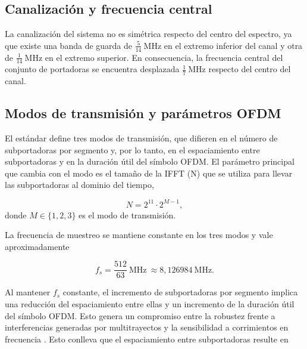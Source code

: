 
\subsection{Canalización y frecuencia central}

La canalización del sistema no es simétrica respecto del centro del espectro, ya que existe una banda de guarda de $\frac{5}{14}\ \mathrm{MHz}$ en el extremo inferior del canal y otra de $\frac{1}{14}\ \mathrm{MHz}$ en el extremo superior. En consecuencia, la frecuencia central del conjunto de portadoras se encuentra desplazada $\frac{1}{7}\ \mathrm{MHz} $ respecto del centro del canal.


\subsection{Modos de transmisión y parámetros OFDM}
El estándar define tres modos de transmisión, que difieren en el número de subportadoras por segmento y, por lo tanto, en el espaciamiento entre subportadoras y en la duración útil del símbolo OFDM. El parámetro principal que cambia con el modo es el tamaño de la IFFT (N) que se utiliza para llevar las subportadoras al dominio del tiempo,

\begin{equation}
N = 2^{11}\cdot 2^{M-1},
\end{equation}
donde $M\in\{1,2,3\}$ es el modo de transmisión.

La frecuencia de muestreo se mantiene constante en los tres modos y vale aproximadamente

\begin{equation}
f_s = \frac{512}{63}\ \mathrm{MHz}\ \approx 8{,}126984\ \mathrm{MHz}.
\end{equation}

Al mantener $f_s$ constante, el incremento de subportadoras por segmento implica una reducción del espaciamiento entre ellas y un incremento de la duración útil del símbolo OFDM. Esto genera un compromiso entre la robustez frente a interferencias generadas por multitrayectos y la sensibilidad a corrimientos en frecuencia \cite{uruguay_tx}. Esto conlleva que el espaciamiento entre subportadoras resulte en

